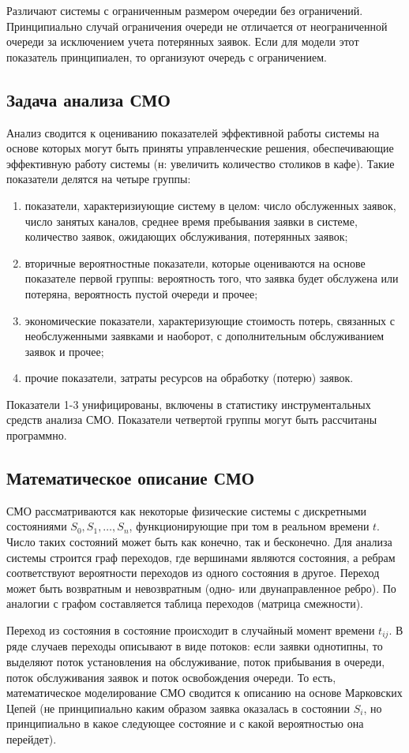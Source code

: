 \documentclass[12pt]{article}
\begin{document}
Различают системы с ограниченным размером очередии без ограничений. Принципиально случай ограничения очереди не отличается от неограниченной очереди за исключением учета потерянных заявок. Если для модели этот показатель принципиален, то организуют очередь с ограничением.

\subsection{Задача анализа СМО}
Анализ сводится к оцениванию показателей эффективной работы системы на основе которых могут быть приняты управленческие решения, обеспечивающие эффективную работу системы (н: увеличить количество столиков в кафе). Такие показатели делятся на четыре группы:
\begin{enumerate}
    \item показатели, характеризиующие систему в целом: число обслуженных заявок, число занятых каналов, среднее время пребывания заявки в системе, количество заявок, ожидающих обслуживания, потерянных заявок;
    \item вторичные вероятностные показатели, которые оцениваются на основе показателе первой группы: вероятность того, что заявка будет обслужена или потеряна, вероятность пустой очереди и прочее;  
    \item экономические показатели, характеризующие стоимость потерь, связанных с необслуженными заявками и наоборот, с дополнительным обслуживанием заявок и прочее;
    \item прочие показатели, затраты ресурсов на обработку (потерю) заявок.
\end{enumerate}
Показатели 1-3 унифицированы, включены в статистику инструментальных средств анализа СМО. Показатели четвертой группы могут быть рассчитаны программно.

\subsection{Математическое описание СМО}
СМО рассматриваются как некоторые физические системы с дискретными состояниями $S_0, S_1, \ldots, S_n$, функционирующие при том в реальном времени $t$. Число таких состояний может быть как конечно, так и бесконечно. Для анализа системы строится граф переходов, где вершинами являются состояния, а ребрам соответствуют вероятности переходов из одного состояния в другое. Переход может быть возвратным и невозвратным (одно- или двунаправленное ребро). По аналогии с графом составляется таблица переходов (матрица смежности).

Переход из состояния в состояние происходит в случайный момент времени $t_{ij}$. В ряде случаев переходы описывают в виде потоков: если заявки однотипны, то выделяют поток установления на обслуживание, поток прибывания в очереди, поток обслуживания заявок и поток освобождения очереди. То есть, математическое моделирование СМО сводится к описанию на основе Марковских Цепей (не принципиально каким образом заявка оказалась в состоянии $S_i$, но принципиально в какое следующее состояние и с какой вероятностью она перейдет).
\end{document}

